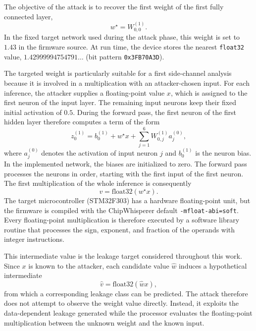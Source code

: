 \documentclass[conference]{IEEEtran}
\begin{document}
The objective of the attack is to recover the first weight of the first fully connected layer,
\begin{equation*}
	w^\star = W^{(1)}_{0,0}.
\end{equation*}
In the fixed target network used during the attack phase, this weight is set to $1.43$ in the firmware source.
At run time, the device stores the nearest \texttt{float32} value, $1.42999994754791\ldots$ (bit pattern \texttt{0x3FB70A3D}).

The targeted weight is particularly suitable for a first side-channel analysis because it is involved in a multiplication with an attacker-chosen input.
For each inference, the attacker supplies a floating-point value $x$, which is assigned to the first neuron of the input layer.
The remaining input neurons keep their fixed initial activation of $0.5$.
During the forward pass, the first neuron of the first hidden layer therefore computes a term of the form
\begin{equation*}
	z_0^{(1)}
	=
	b_0^{(1)}
	+
	w^\star x
	+
	\sum_{j=1}^{6} W^{(1)}_{0,j} a_j^{(0)},
\end{equation*}
where $a_j^{(0)}$ denotes the activation of input neuron $j$ and $b_0^{(1)}$ is the neuron bias.
In the implemented network, the biases are initialized to zero.
The forward pass processes the neurons in order, starting with the first input of the first neuron.
The first multiplication of the whole inference is consequently
\begin{equation*}
	v = \mathrm{float32}(w^\star x).
\end{equation*}
The target microcontroller (STM32F303) has a hardware floating-point unit, but the firmware is compiled with the ChipWhisperer default \texttt{-mfloat-abi=soft}.
Every floating-point multiplication is therefore executed by a software library routine that processes the sign, exponent, and fraction of the operands with integer instructions.

This intermediate value is the leakage target considered throughout this work.
Since $x$ is known to the attacker, each candidate value $\hat{w}$ induces a hypothetical intermediate
\begin{equation*}
	\hat{v}
	=
	\mathrm{float32}(\hat{w}x),
\end{equation*}
from which a corresponding leakage class can be predicted.
The attack therefore does not attempt to observe the weight value directly.
Instead, it exploits the data-dependent leakage generated while the processor evaluates the floating-point multiplication between the unknown weight and the known input.
\end{document}

